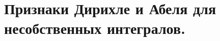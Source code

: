\documentclass[../main.tex]{subfiles}
\begin{document}
\newpage
\section{Признаки Дирихле и Абеля для несобственных интегралов.}
\end{document}
